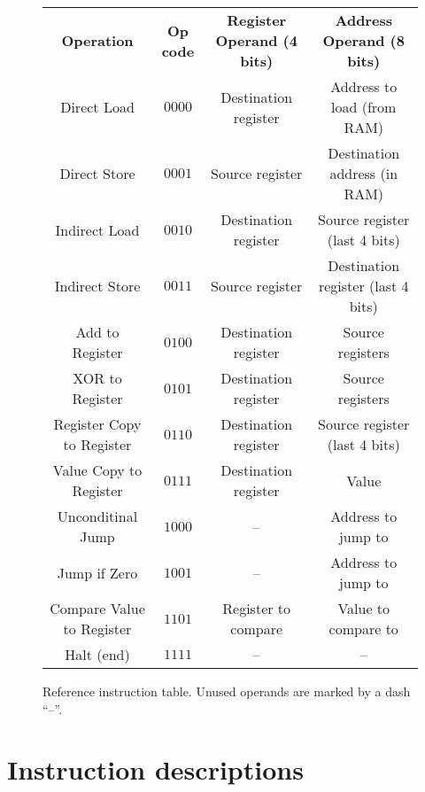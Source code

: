 \documentclass[11pt]{article}
\begin{document}
\begin{figure}[h]
  \centering
  \begin{tabular}{c c c c}
    \textbf{Operation} & \textbf{Op code} &
    \textbf{Register Operand (4 bits)} & \textbf{Address Operand (8 bits)} \\
    Direct Load &
    $0000$ & Destination register & Address to load (from RAM) \\
    Direct Store &
    $0001$ & Source register & Destination address (in RAM) \\
    Indirect Load &
    $0010$ & Destination register & Source register (last 4 bits) \\
    Indirect Store &
    $0011$ & Source register & Destination register (last 4 bits) \\
    Add to Register  &
    $0100$ & Destination register & Source registers \\
    XOR to Register &
    $0101$ & Destination register & Source registers \\
    Register Copy to Register &
    $0110$ & Destination register & Source register (last 4 bits) \\
    Value Copy to Register &
    $0111$ & Destination register & Value \\
    Unconditinal Jump &
    $1000$ & -- & Address to jump to \\
    Jump if Zero &
    $1001$ & -- & Address to jump to \\
    Compare Value to Register &
    $1101$ & Register to compare & Value to compare to \\
    Halt (end) &
    $1111$ & -- & --
  \end{tabular}
  \caption{%
    Reference instruction table. Unused operands are marked by a dash ``--''.
  }
\end{figure}

\section*{Instruction descriptions}
\end{document}
